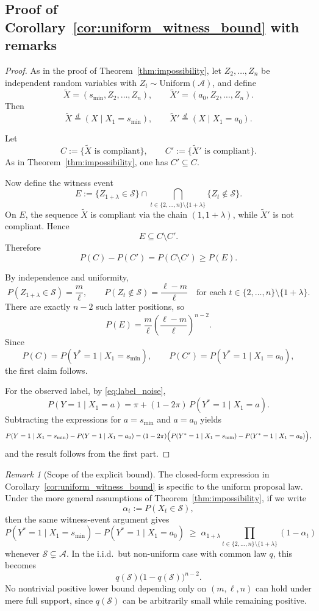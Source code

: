 \documentclass{article}
\theoremstyle{plain}
\theoremstyle{definition}
\theoremstyle{remark}
\newtheorem{remark}[theorem]{Remark}
\begin{document}
\subsection{Proof of Corollary~\ref{cor:uniform_witness_bound} with remarks}
\label{appendix:proof_uniform_witness_bound}
\begin{proof}
As in the proof of Theorem~\ref{thm:impossibility}, let
$Z_2,\ldots,Z_n$ be independent random variables with
$Z_t\sim \mathrm{Uniform}(\mathcal{A})$, and define
\[
\widetilde X=(s_{\min},Z_2,\ldots,Z_n),
\qquad
\widetilde X'=(a_0,Z_2,\ldots,Z_n).
\]
Then
\[
\widetilde X \stackrel{d}{=} (X\mid X_1=s_{\min}),
\qquad
\widetilde X' \stackrel{d}{=} (X\mid X_1=a_0).
\]

Let
\[
C:=\{\widetilde X \text{ is compliant}\},
\qquad
C':=\{\widetilde X' \text{ is compliant}\}.
\]
As in Theorem~\ref{thm:impossibility}, one has $C'\subseteq C$.

Now define the witness event
\[
E
:=
\{Z_{1+\lambda}\in\mathcal{S}\}
\cap
\bigcap_{t\in\{2,\ldots,n\}\setminus\{1+\lambda\}}
\{Z_t\notin\mathcal{S}\}.
\]
On $E$, the sequence $\widetilde X$ is compliant via the chain
$(1,1+\lambda)$, while $\widetilde X'$ is not compliant. Hence
\[
E \subseteq C\setminus C'.
\]
Therefore
\[
P(C)-P(C') = P(C\setminus C') \ge P(E).
\]

By independence and uniformity,
\[
P(Z_{1+\lambda}\in\mathcal{S})=\frac{m}{\ell},
\qquad
P(Z_t\notin\mathcal{S})=\frac{\ell-m}{\ell}
\quad
\text{for each } t\in\{2,\ldots,n\}\setminus\{1+\lambda\}.
\]
There are exactly $n-2$ such latter positions, so
\[
P(E)
=
\frac{m}{\ell}\left(\frac{\ell-m}{\ell}\right)^{n-2}.
\]
Since
\[
P(C)=P(Y^*=1\mid X_1=s_{\min}),
\qquad
P(C')=P(Y^*=1\mid X_1=a_0),
\]
the first claim follows.

For the observed label, by \eqref{eq:label_noise},
\[
P(Y=1\mid X_1=a)
=
\pi + (1-2\pi)\,P(Y^*=1\mid X_1=a).
\]
Subtracting the expressions for $a=s_{\min}$ and $a=a_0$ yields
\[
P(Y=1\mid X_1=s_{\min})
-
P(Y=1\mid X_1=a_0)
=
(1-2\pi)\Bigl(
P(Y^*=1\mid X_1=s_{\min})
-
P(Y^*=1\mid X_1=a_0)
\Bigr),
\]
and the result follows from the first part.
\end{proof}

\begin{remark}[Scope of the explicit bound]
\label{rem:scope_uniform_bound}
The closed-form expression in Corollary~\ref{cor:uniform_witness_bound} is
specific to the uniform proposal law. Under the more general assumptions of
Theorem~\ref{thm:impossibility}, if we write
\[
\alpha_t := P(X_t\in\mathcal{S}),
\]
then the same witness-event argument gives
\[
P(Y^*=1\mid X_1=s_{\min})
-
P(Y^*=1\mid X_1=a_0)
\;\ge\;
\alpha_{1+\lambda}
\prod_{t\in\{2,\ldots,n\}\setminus\{1+\lambda\}}(1-\alpha_t)
\]
whenever $\mathcal{S}\subsetneq\mathcal{A}$.
In the i.i.d.\ but non-uniform case with common law $q$, this becomes
\[
q(\mathcal{S})\bigl(1-q(\mathcal{S})\bigr)^{n-2}.
\]
No nontrivial positive lower bound depending only on $(m,\ell,n)$ can hold under
mere full support, since $q(\mathcal{S})$ can be arbitrarily small while
remaining positive.
\end{remark}
\end{document}
